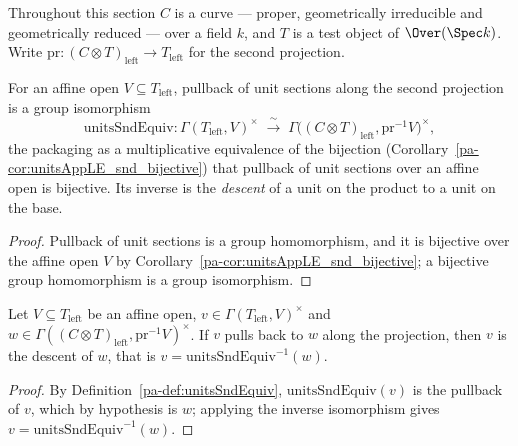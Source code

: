 Throughout this section \(C\) is a curve — proper, geometrically irreducible and geometrically
reduced — over a field \(k\), and \(T\) is a test object of \(\Over(\Spec k)\).  Write
\(\mathrm{pr} \colon (C \otimes T)_{\mathrm{left}} \to T_{\mathrm{left}}\) for the second
projection.

\begin{definition}
  \label{pa-def:unitsSndEquiv}
  \leanok

  For an affine open \(V \subseteq T_{\mathrm{left}}\), pullback of unit sections along the
  second projection is a group isomorphism
  \[
    \mathrm{unitsSndEquiv} \colon \Gamma(T_{\mathrm{left}}, V)^{\times} \;\xrightarrow{\ \sim\
    }\; \Gamma\bigl((C \otimes T)_{\mathrm{left}}, \mathrm{pr}^{-1} V\bigr)^{\times},
  \]
  the packaging as a multiplicative equivalence of the bijection
  (Corollary~\ref{pa-cor:unitsAppLE_snd_bijective}) that pullback of unit sections over an affine
  open is bijective.  Its inverse is the \emph{descent} of a unit on the product to a unit on
  the base.
\end{definition}
\begin{proof}
  \leanok
  Pullback of unit sections is a group homomorphism, and it is bijective over the affine open
  \(V\) by Corollary~\ref{pa-cor:unitsAppLE_snd_bijective}; a bijective group homomorphism is a
  group isomorphism.
\end{proof}

\begin{lemma}
  \label{pa-lem:unitsSndEquiv_symm_eq_of_unitsAppLE}
  \leanok

  Let \(V \subseteq T_{\mathrm{left}}\) be an affine open, \(v \in \Gamma(T_{\mathrm{left}},
  V)^{\times}\) and \(w \in \Gamma((C \otimes T)_{\mathrm{left}}, \mathrm{pr}^{-1}
  V)^{\times}\).  If \(v\) pulls back to \(w\) along the projection, then \(v\) is the descent
  of \(w\), that is \(v = \mathrm{unitsSndEquiv}^{-1}(w)\).
\end{lemma}
\begin{proof}
  \leanok
  By Definition~\ref{pa-def:unitsSndEquiv}, \(\mathrm{unitsSndEquiv}(v)\) is the pullback of \(v\),
  which by hypothesis is \(w\); applying the inverse isomorphism gives \(v =
  \mathrm{unitsSndEquiv}^{-1}(w)\).
\end{proof}

